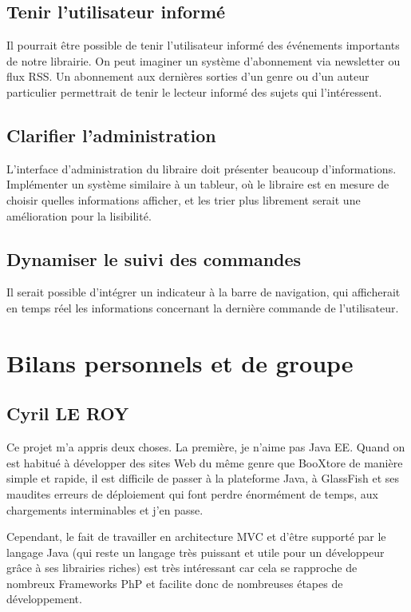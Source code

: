 	\subsection{Tenir l'utilisateur informé}

	Il pourrait être possible de tenir l'utilisateur informé des événements importants de notre librairie. On peut imaginer un système d'abonnement via newsletter ou flux RSS. Un abonnement aux dernières sorties d'un genre ou d'un auteur particulier permettrait de tenir le lecteur informé des sujets qui l'intéressent.

	\subsection{Clarifier l'administration}

	L'interface d'administration du libraire doit présenter beaucoup d'informations. Implémenter un système similaire à un tableur, où le libraire est en mesure de choisir quelles informations afficher, et les trier plus librement serait une amélioration pour la lisibilité.

	\subsection{Dynamiser le suivi des commandes}

	Il serait possible d'intégrer un indicateur à la barre de navigation, qui afficherait en temps réel les informations concernant la dernière commande de l'utilisateur.

\section{Bilans personnels et de groupe}


\subsection{Cyril LE ROY}
Ce projet m’a appris deux choses.
La première, je n’aime pas Java EE. Quand on est habitué à développer des sites Web du même genre que BooXtore de manière simple et rapide, il est difficile de passer à la plateforme Java, à GlassFish et ses maudites erreurs de déploiement qui font perdre énormément de temps, aux chargements interminables et j’en passe.

Cependant, le fait de travailler en architecture MVC et d’être supporté par le langage Java (qui reste un langage très puissant et utile pour un développeur grâce à ses librairies riches) est très intéressant car cela se rapproche de nombreux Frameworks PhP et facilite donc de nombreuses étapes de développement.

